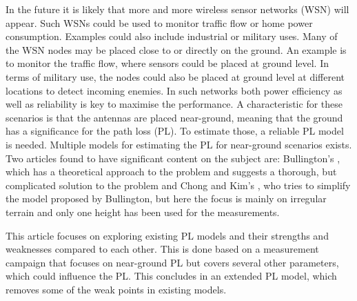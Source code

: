 
In the future it is likely that more and more wireless sensor networks (WSN) will appear. Such WSNs could be used to monitor traffic flow or home power consumption. Examples could also include industrial or military uses. Many of the WSN nodes may be placed close to or directly on the ground. An example is to monitor the traffic flow, where sensors could be placed at ground level. In terms of military use, the nodes could also be placed at ground level at different locations to detect incoming enemies. In such networks both power efficiency as well as reliability is key to maximise the performance. A characteristic for these scenarios is that the antennas are placed near-ground, meaning that the ground has a significance for the path loss (PL). To estimate those, a reliable PL model is needed.
Multiple models for estimating the PL for near-ground scenarios exists. Two articles found to have significant content on the subject are: Bullington's \cite{Bullington}, which has a theoretical approach to the problem and suggests a thorough, but complicated solution to the problem and Chong and Kim's \cite{Chong}, who tries to simplify the model proposed by Bullington, but here the focus is mainly on irregular terrain and only one height has been used for the measurements.

This article focuses on exploring existing PL models and their strengths and weaknesses compared to each other. This is done based on a measurement campaign that focuses on near-ground PL but covers several other parameters, which could influence the PL. This concludes in an extended PL model, which removes some of the weak points in existing models.



